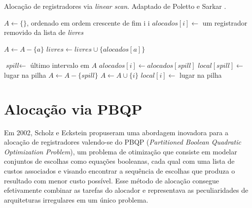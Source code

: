 \documentclass[
	12pt,				%
	openright,			%
	oneside,			%
	a4paper,			%
	tccpreliminar,			%
	]{ABNT-DC-UEL}
\begin{document}
\begin{algorithm}[H]
    \caption{Alocação de registradores via \textit{linear scan}. Adaptado de Poletto e Sarkar \cite{poletto:99}.}
    \begin{algorithmic}
            \State $A \gets \{\}$, ordenado em ordem crescente de fim
                \State {} {i}
                    \State {} {i}
                \Else
                    \State $\textit{alocados}[i] \gets$ um registrador removido da lista de \textit{livres}
                \EndIf
            \EndFor
        \EndProcedure
        
                    \State \Return
                \EndIf
                \State $A \gets A-\{a\}$
                \State $\textit{livres} \gets \textit{livres} \cup \{\textit{alocados}[a]\}$
            \EndFor
        \EndFunction
        
            \State $\textit{spill} \gets$ último intervalo em $A$
                \State $\textit{alocados}[i] \gets \textit{alocados}[\textit{spill}]$
                \State $\textit{local}[\textit{spill}] \gets $ lugar na pilha
                \State $A \gets A - \{\textit{spill}\}$
                \State $A \gets A \cup \{i\}$
            \Else
                \State $\textit{local}[\textit{i}] \gets $ lugar na pilha
            \EndIf
        \EndFunction
    \end{algorithmic}
    \label{alg:1}
\end{algorithm}

\section{Alocação via PBQP}

Em 2002, Scholz e Eckstein \cite{scholz:02} propuseram uma abordagem inovadora para a alocação de registradores valendo-se do PBQP (\textit{Partitioned Boolean Quadratic Optimization Problem}), um problema de otimização que consiste em modelar conjuntos de escolhas como equações booleanas, cada qual com uma lista de custos associados e visando encontrar a sequência de escolhas que produza o resultado com menor custo possível. Esse método de alocação consegue efetivamente combinar as tarefas do alocador e representava as peculiaridades de arquiteturas irregulares em um único problema.
\end{document}
